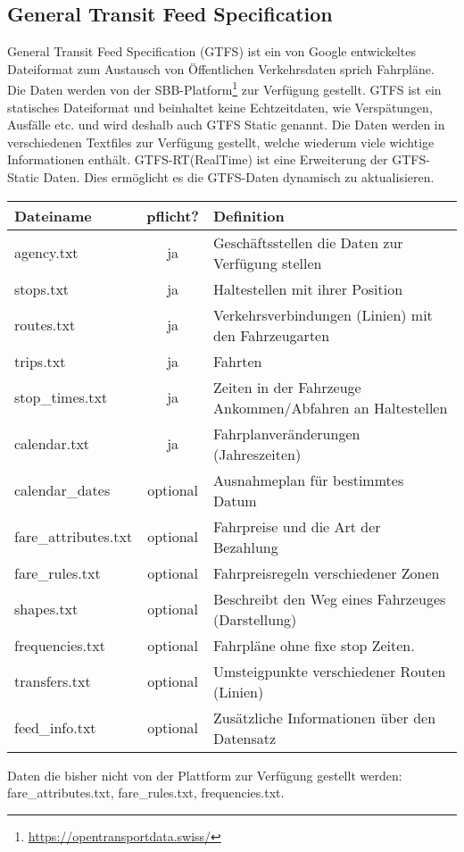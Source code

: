  

\subsection{General Transit Feed Specification}
General Transit Feed Specification (GTFS)\cite{gtfsinhalt}\cite{gtfs} ist ein von Google entwickeltes Dateiformat zum Austausch von Öffentlichen Verkehrsdaten sprich Fahrpläne. Die Daten werden von der SBB-Platform\footnote{\url{https://opentransportdata.swiss/}} zur Verfügung gestellt. GTFS ist ein statisches Dateiformat und beinhaltet keine Echtzeitdaten, wie Verspätungen, Ausfälle etc. und wird deshalb auch GTFS Static genannt. Die Daten werden in verschiedenen Textfiles zur Verfügung gestellt, welche wiederum viele wichtige Informationen enthält. GTFS-RT(RealTime) ist eine Erweiterung der GTFS-Static Daten. Dies ermöglicht es die GTFS-Daten dynamisch zu aktualisieren. \cite{gtfs-rt-google} \newline

\begin{tabular}{|l|c|l|}  \hline
	Dateiname & pflicht? & Definition \\ \hline
	agency.txt & ja & Geschäftsstellen die Daten zur Verfügung stellen \\ \hline
	stops.txt & ja & Haltestellen mit ihrer Position \\ \hline
	routes.txt & ja & Verkehrsverbindungen (Linien) mit den Fahrzeugarten \\ \hline %
	trips.txt & ja & Fahrten  \\ \hline												%
	stop\_times.txt & ja & Zeiten in der Fahrzeuge Ankommen/Abfahren an Haltestellen \\ \hline
	calendar.txt & ja & Fahrplanveränderungen (Jahreszeiten) \\ \hline
	calendar\_dates & optional & Ausnahmeplan für bestimmtes Datum \\ \hline
	fare\_attributes.txt & optional & Fahrpreise und die Art der Bezahlung \\ \hline
	fare\_rules.txt & optional & Fahrpreisregeln verschiedener Zonen  \\ \hline
	shapes.txt & optional & Beschreibt den Weg eines Fahrzeuges (Darstellung) \\ \hline
	frequencies.txt & optional & Fahrpläne ohne fixe stop Zeiten. \\ \hline
	transfers.txt & optional & Umsteigpunkte verschiedener Routen (Linien) \\ \hline
	feed\_info.txt & optional & Zusätzliche Informationen über den Datensatz \\ \hline	
\end{tabular}

Daten die bisher nicht von der Plattform zur Verfügung gestellt werden: fare\_attributes.txt, fare\_rules.txt, frequencies.txt.


